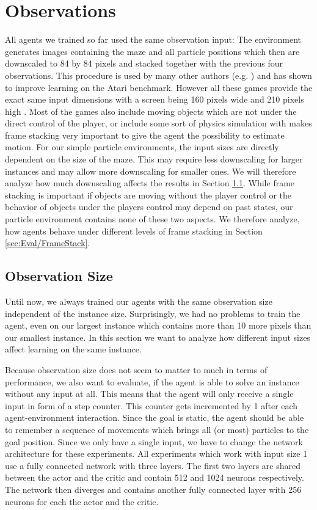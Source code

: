 \section{Observations} \label{sec:EvalObs}
All agents we trained so far used the same observation input: The environment generates images containing the maze and all particle positions which then are downscaled to 84 by 84 pixels and stacked together with the previous four observations. This procedure is used by many other authors (e.g. \cite{burda2018large, mnih2015human}) and has shown to improve learning on the Atari benchmark. However all these games provide the exact same input dimensions with a screen being 160 pixels wide and 210 pixels high \cite{bellemare2013arcade}. Most of the games also include moving objects which are not under the direct control of the player, or include some sort of physics simulation with makes frame stacking very important to give the agent the possibility to estimate motion. For our simple particle environments, the input sizes are directly dependent on the size of the maze. This may require less downscaling for larger instances and may allow more downscaling for smaller ones. We will therefore analyze how much downscaling affects the results in Section \ref{sec:Eval/ObsSize}. While frame stacking is important if objects are moving without the player control or the behavior of objects under the players control may depend on past states, our particle environment contains none of these two aspects. We therefore analyze, how agents behave under different levels of frame stacking in Section \ref{sec:Eval/FrameStack}.


\subsection{Observation Size} \label{sec:Eval/ObsSize}
Until now, we always trained our agents with the same observation size independent of the instance size. Surprisingly, we had no problems to train the agent, even on our largest instance which contains more than 10 more pixels than our smallest instance. In this section we want to analyze how different input sizes affect learning on the same instance. 

Because observation size does not seem to matter to much in terms of performance, we also want to evaluate, if the agent is able to solve an instance without any input at all. This means that the agent will only receive a single input in form of a step counter. This counter gets incremented by 1 after each agent-environment interaction. Since the goal is static, the agent should be able to remember a sequence of movements which brings all (or most) particles to the goal position. Since we only have a single input, we have to change the network architecture for these experiments. All experiments which work with input size 1 use a fully connected network with three layers. The first two layers are shared between the actor and the critic and contain 512 and 1024 neurons respectively. The network then diverges and contains another fully connected layer with 256 neurons for each the actor and the critic.

